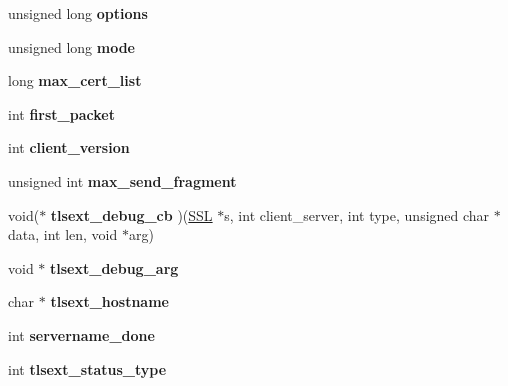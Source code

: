 \begin{DoxyCompactItemize}
\mbox{\label{structssl__st_a82c8bfd123603c23ccca6fb45be6d75f}} 
unsigned long {\bfseries options}
\item 
\mbox{\label{structssl__st_a10add2996a9ac029c3a8a4c19587e1b0}} 
unsigned long {\bfseries mode}
\item 
\mbox{\label{structssl__st_add94a8a6fe24dad252c559253d0eea9a}} 
long {\bfseries max\+\_\+cert\+\_\+list}
\item 
\mbox{\label{structssl__st_ad3c31c44e1c20703dc023f4a14fa0d54}} 
int {\bfseries first\+\_\+packet}
\item 
\mbox{\label{structssl__st_af898db9604614a95a6830fbb5ce31850}} 
int {\bfseries client\+\_\+version}
\item 
\mbox{\label{structssl__st_a201ff2c24c4a950fc529451563dac099}} 
unsigned int {\bfseries max\+\_\+send\+\_\+fragment}
\item 
\mbox{\label{structssl__st_af36d613ef84698654b438baf81872ee6}} 
void($\ast$ {\bfseries tlsext\+\_\+debug\+\_\+cb} )(\hyperlink{structssl__st}{S\+SL} $\ast$s, int client\+\_\+server, int type, unsigned char $\ast$data, int len, void $\ast$arg)
\item 
\mbox{\label{structssl__st_a37c9fa10121176491c8a9e5617f7be83}} 
void $\ast$ {\bfseries tlsext\+\_\+debug\+\_\+arg}
\item 
\mbox{\label{structssl__st_a693888a588035f237e93b0bce7af4b84}} 
char $\ast$ {\bfseries tlsext\+\_\+hostname}
\item 
\mbox{\label{structssl__st_ac1ac6725cca99bc51b875fbe62ccb504}} 
int {\bfseries servername\+\_\+done}
\item 
\mbox{\label{structssl__st_aba46c200c19caf4051d001f5ca0475e3}} 
int {\bfseries tlsext\+\_\+status\+\_\+type}
\item 
\mbox{\label{structssl__st_a0a0d75de2cdedb99c07403d56aa9ae8c}} 

\end{DoxyCompactItemize}
